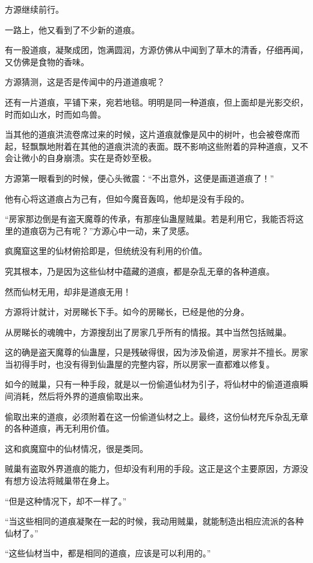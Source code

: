 \begin{this_body}
方源继续前行。

一路上，他又看到了不少新的道痕。

有一股道痕，凝聚成团，饱满圆润，方源仿佛从中闻到了草木的清香，仔细再闻，又仿佛是食物的香味。

方源猜测，这是否是传闻中的丹道道痕呢？

还有一片道痕，平铺下来，宛若地毯。明明是同一种道痕，但上面却是光影交织，时而如山水，时而如鸟兽。

当其他的道痕洪流卷席过来的时候，这片道痕就像是风中的树叶，也会被卷席而起，轻飘飘地附着在其他的道痕洪流的表面。既不影响这些附着的异种道痕，又不会让微小的自身崩溃。实在是奇妙至极。

方源第一眼看到的时候，便心头微震：“不出意外，这便是画道道痕了！”

他有心将这道痕占为己有，但如今魔音轰鸣，他却是没有手段的。

“房家那边倒是有盗天魔尊的传承，有那座仙蛊屋贼巢。若是利用它，我能否将这里的道痕窃为己有呢？”方源心中一动，来了灵感。

疯魔窟这里的仙材俯拾即是，但统统没有利用的价值。

究其根本，乃是因为这些仙材中蕴藏的道痕，都是杂乱无章的各种道痕。

然而仙材无用，却非是道痕无用！

方源将计就计，对房睇长下手。如今的房睇长，已经是他的分身。

从房睇长的魂魄中，方源搜刮出了房家几乎所有的情报。其中当然包括贼巢。

这的确是盗天魔尊的仙蛊屋，只是残破得很，因为涉及偷道，房家并不擅长。房家当初得手时，也没有得到仙蛊屋的完整内容，所以房家一直都难以修复。

如今的贼巢，只有一种手段，就是以一份偷道仙材为引子，将仙材中的偷道道痕瞬间消耗，然后将外界的道痕偷取出来。

偷取出来的道痕，必须附着在这一份偷道仙材之上。最终，这份仙材充斥杂乱无章的各种道痕，再无利用价值。

这和疯魔窟中的仙材情况，很是类同。

贼巢有盗取外界道痕的能力，但却没有利用的手段。这正是这个主要原因，方源没有想方设法将贼巢带在身上。

“但是这种情况下，却不一样了。”

“当这些相同的道痕凝聚在一起的时候，我动用贼巢，就能制造出相应流派的各种仙材了。”

“这些仙材当中，都是相同的道痕，应该是可以利用的。”


\end{this_body}
